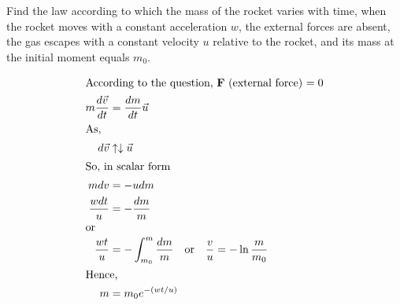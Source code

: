 \item Find the law according to which the mass of the rocket varies with time, when the rocket moves with a constant acceleration \( w \), the external forces are absent, the gas escapes with a constant velocity \( u \) relative to the rocket, and its mass at the initial moment equals \( m_{0} \).
\begin{solution}
    \begin{center}
    \end{center}

    \begin{align*}
        \intertext{According to the question, $\mathbf{F}$ (external force) $= 0$}
        m\dfrac{d\vec{v}}{dt} &= \dfrac{dm}{dt} \vec{u}\\
        \intertext{As,}
        d\vec{v} & \uparrow \downarrow \vec{u}\\
        \intertext{So, in scalar form}
        mdv &= -udm \\
        \dfrac{wdt}{u} &= -\dfrac{dm}{m} \\
        \intertext{or}
        \dfrac{wt}{u} & = -\int_{m_0}^{m} \dfrac{dm}{m} \quad \text{or} \quad \dfrac{v}{u} = -\ln\dfrac{m}{m_0}\\
        \intertext{Hence,}
        m &= m_0 e^{-(wt/u)}
    \end{align*}
\end{solution}

